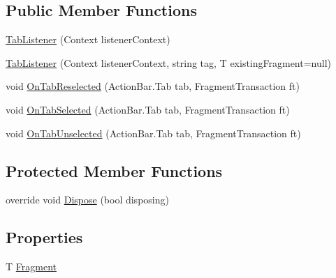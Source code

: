 \subsection*{Public Member Functions}
\begin{DoxyCompactItemize}
\item 
\hyperlink{class_s_q_lite_1_1_android_1_1_sample_1_1_tab_listener_3_01_t_01_4_a6dc53595826e30b53cefe742e3cb91e4}{Tab\+Listener} (Context listener\+Context)
\item 
\hyperlink{class_s_q_lite_1_1_android_1_1_sample_1_1_tab_listener_3_01_t_01_4_a551e82a619bcb314511039c2d4164abd}{Tab\+Listener} (Context listener\+Context, string tag, T existing\+Fragment=null)
\item 
void \hyperlink{class_s_q_lite_1_1_android_1_1_sample_1_1_tab_listener_3_01_t_01_4_ad5ef151ae7fd3d998e109313498c8d17}{On\+Tab\+Reselected} (Action\+Bar.\+Tab tab, Fragment\+Transaction ft)
\item 
void \hyperlink{class_s_q_lite_1_1_android_1_1_sample_1_1_tab_listener_3_01_t_01_4_a0aea1f5fafbbdd3bff08ce279b749b17}{On\+Tab\+Selected} (Action\+Bar.\+Tab tab, Fragment\+Transaction ft)
\item 
void \hyperlink{class_s_q_lite_1_1_android_1_1_sample_1_1_tab_listener_3_01_t_01_4_a586a4d8b8309471062fe322e6a64e106}{On\+Tab\+Unselected} (Action\+Bar.\+Tab tab, Fragment\+Transaction ft)
\end{DoxyCompactItemize}
\subsection*{Protected Member Functions}
\begin{DoxyCompactItemize}
\item 
override void \hyperlink{class_s_q_lite_1_1_android_1_1_sample_1_1_tab_listener_3_01_t_01_4_aab29b8446ffce1d81a7307cd26b669d0}{Dispose} (bool disposing)
\end{DoxyCompactItemize}
\subsection*{Properties}
\begin{DoxyCompactItemize}
\item 
T \hyperlink{class_s_q_lite_1_1_android_1_1_sample_1_1_tab_listener_3_01_t_01_4_a49819f987c20a40b2b88f101fd537ada}{Fragment}
\end{DoxyCompactItemize}


